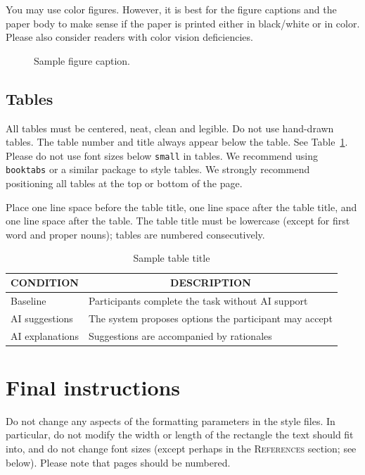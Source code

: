 \documentclass{article} %
\begin{document}
You may use color figures.
However, it is best for the
figure captions and the paper body to make sense if the paper is printed
either in black/white or in color. Please also consider readers with color
vision deficiencies.
\begin{figure}[t]
\begin{center}
\fbox{\rule[-.5cm]{0cm}{4cm} \rule[-.5cm]{4cm}{0cm}}
\end{center}
\caption{Sample figure caption.}
\end{figure}

\subsection{Tables}

All tables must be centered, neat, clean and legible. Do not use hand-drawn
tables. The table number and title always appear below the table. See
Table~\ref{sample-table}. Please do not use font sizes below {\tt small} in
tables. We recommend using {\tt booktabs} or a similar package to style tables.
We strongly recommend positioning all tables at the top or bottom of the page.

Place one line space before the table title, one line space after the table
title, and one line space after the table. The table title must be lowercase
(except for first word and proper nouns); tables are numbered consecutively.

\begin{table}[t]
\begin{center}
\begin{tabular}{ll}
\toprule
\multicolumn{1}{c}{\bf CONDITION}  &\multicolumn{1}{c}{\bf DESCRIPTION} \\
\midrule
Baseline         &Participants complete the task without AI support \\
AI suggestions   &The system proposes options the participant may accept \\
AI explanations  &Suggestions are accompanied by rationales \\
\bottomrule
\end{tabular}
\end{center}
\caption{Sample table title}\label{sample-table}
\end{table}


\section{Final instructions}
Do not change any aspects of the formatting parameters in the style files.
In particular, do not modify the width or length of the rectangle the text
should fit into, and do not change font sizes (except perhaps in the
\textsc{References} section; see below). Please note that pages should be
numbered.
\end{document}
